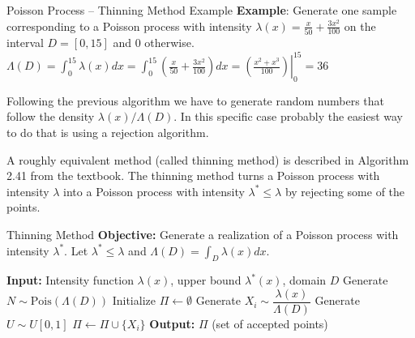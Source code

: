 \documentclass[8pt]{beamer}
\begin{document}
\begin{frame}{Poisson Process -- Thinning Method Example}
\textbf{Example}: Generate one sample corresponding to a Poisson process with  intensity $\displaystyle{\lambda(x)=\frac{x}{50}+\frac{3x^2}{100}}$ on the interval $D=[0,15]$ and 0 otherwise.
$\displaystyle{\Lambda(D)=\int_0^{15} \lambda(x) dx=\int_0^{15} \left(\frac{x}{50}+\frac{3x^2}{100}\right) dx=\left.\left( \frac{x^2+x^3}{100} \right) \right|_0^{15}=36}$
\
\vspace{3mm}

Following the previous algorithm we have to generate random numbers that follow the density $\lambda(x)/\Lambda(D)$. In this specific case probably the easiest way to do that is using a rejection algorithm.

\vspace{3mm}

A roughly equivalent method (called thinning method) is described in Algorithm 2.41 from the textbook. The thinning method turns a Poisson process with intensity $\lambda$ into a Poisson process with intensity 
$\lambda^*\leq\lambda$ by rejecting some of the points.
\end{frame}

\begin{frame}{Thinning Method}
\textbf{Objective:} Generate a realization of a Poisson process with intensity $\lambda^*$. Let $\lambda^*\leq\lambda$ and $\Lambda(D)=\int_D \lambda(x)dx$.

\vspace{2mm}
\begin{algorithm}[H]
\caption{Generate a Nonhomogeneous Poisson Process via Thinning}
\label{alg:nonhom-poisson}
\begin{algorithmic}[1]
  \State \textbf{Input:} Intensity function $\lambda(x)$, upper bound $\lambda^*(x)$, domain $D$
  \State Generate $N \sim \text{Pois}(\Lambda(D))$
  \State Initialize $\Pi \gets \emptyset$
    \State Generate $X_i \sim \dfrac{\lambda(x)}{\Lambda(D)}$
    \State Generate $U \sim U[0,1]$
      \State $\Pi \gets \Pi \cup \{X_i\}$
    \EndIf
  \EndFor
  \State \textbf{Output:} $\Pi$ (set of accepted points)
\end{algorithmic}
\end{algorithm}
\end{frame}
\end{document}
